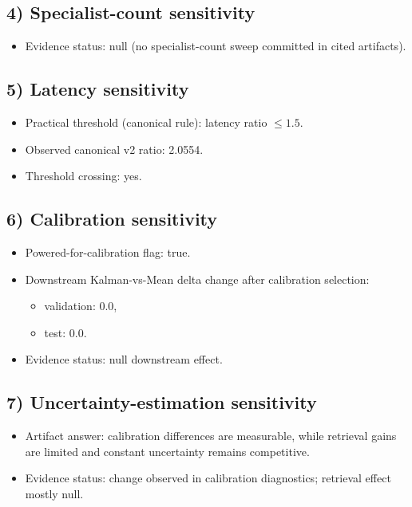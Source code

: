 \subsection*{4) Specialist-count sensitivity}
\begin{itemize}
  \item Evidence status: null (no specialist-count sweep committed in cited artifacts).
\end{itemize}

\subsection*{5) Latency sensitivity}
\begin{itemize}
  \item Practical threshold (canonical rule): latency ratio $\leq 1.5$.
  \item Observed canonical v2 ratio: 2.0554.
  \item Threshold crossing: yes.
\end{itemize}

\subsection*{6) Calibration sensitivity}
\begin{itemize}
  \item Powered-for-calibration flag: true.
  \item Downstream Kalman-vs-Mean delta change after calibration selection:
    \begin{itemize}
      \item validation: 0.0,
      \item test: 0.0.
    \end{itemize}
  \item Evidence status: null downstream effect.
\end{itemize}

\subsection*{7) Uncertainty-estimation sensitivity}
\begin{itemize}
  \item Artifact answer: calibration differences are measurable, while retrieval gains are limited and constant uncertainty remains competitive.
  \item Evidence status: change observed in calibration diagnostics; retrieval effect mostly null.
\end{itemize}

